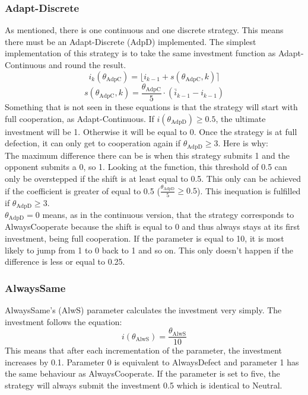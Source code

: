 \documentclass{article}
\newcommand{\round}[1]{\ensuremath{\lfloor#1\rceil}}
\begin{document}
\subsubsection*{Adapt-Discrete}
As mentioned, there is one continuous and one discrete strategy.
This means there must be an Adapt-Discrete (AdpD) implemented.
The simplest implementation of this strategy is to take the same investment function as Adapt-Continuous and round the result.
$$i_k(\theta_{\mathrm{AdpC}}) = \round{i_{k-1} + s(\theta_{\mathrm{AdpC}}, k)}$$
$$s(\theta_{\mathrm{AdpC}}, k) = \frac{\theta_{\mathrm{AdpC}}}{5} \cdot (\bar i_{k-1} - i_{k-1})$$
Something that is not seen in these equations is that the strategy will start with full cooperation, as Adapt-Continuous.
If $i(\theta_{\mathrm{AdpD}}) \ge 0.5$, the ultimate investment will be 1.
Otherwise it will be equal to 0.
Once the strategy is at full defection, it can only get to cooperation again if $\theta_{\mathrm{AdpD}} \ge 3$.
Here is why:\\
The maximum difference there can be is when this strategy submits 1 and the opponent submits a 0, so 1.
Looking at the function, this threshold of 0.5 can only be overstepped if the shift is at least equal to 0.5.
This only can be achieved if the coefficient is greater of equal to 0.5 ($\frac{\theta_{\mathrm{AdpD}}}{5} \ge 0.5$).
This inequation is fulfilled if $\theta_{\mathrm{AdpD}} \ge 3$.\\
$\theta_{\mathrm{AdpD}} = 0$ means, as in the continuous version, that the strategy corresponds to AlwaysCooperate because the shift is equal to 0 and thus always stays at its first investment, being full cooperation.
If the parameter is equal to 10, it is most likely to jump from 1 to 0 back to 1 and so on.
This only doesn't happen if the difference is less or equal to 0.25.\\

\subsubsection*{AlwaysSame}
AlwaysSame's (AlwS) parameter calculates the investment very simply.
The investment follows the equation: 
$$i(\theta_{\mathrm{AlwS}}) = \frac{\theta_{\mathrm{AlwS}}}{10}$$
This means that after each incrementation of the parameter, the investment increases by 0.1.
Parameter 0 is equivalent to AlwaysDefect and parameter 1 has the same behaviour as AlwaysCooperate.
If the parameter is set to five, the strategy will always submit the investment 0.5 which is identical to Neutral.\\
\end{document}
